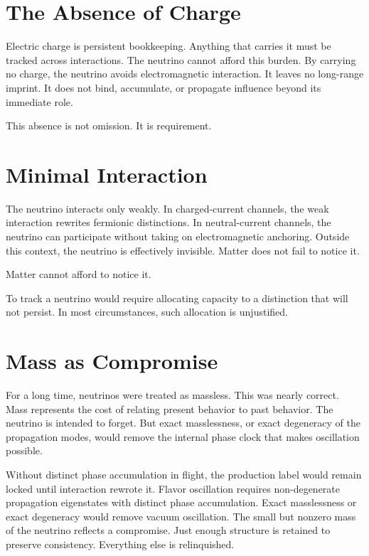 \documentclass[11pt,twoside,openright]{book}
\begin{document}
\section*{The Absence of Charge}

Electric charge is persistent bookkeeping. Anything that carries it must be tracked across interactions. The neutrino cannot afford this burden. By carrying no charge, the neutrino avoids electromagnetic interaction. It leaves no long-range imprint. It does not bind, accumulate, or propagate influence beyond its immediate role.

This absence is not omission. It is requirement.

\section*{Minimal Interaction}

The neutrino interacts only weakly. In charged-current channels, the weak interaction rewrites fermionic distinctions. In neutral-current channels, the neutrino can participate without taking on electromagnetic anchoring. Outside this context, the neutrino is effectively invisible. Matter does not fail to notice it.

Matter cannot afford to notice it.

To track a neutrino would require allocating capacity to a distinction that will not persist. In most circumstances, such allocation is unjustified.

\section*{Mass as Compromise}

For a long time, neutrinos were treated as massless. This was nearly correct. Mass represents the cost of relating present behavior to past behavior. The neutrino is intended to forget. But exact masslessness, or exact degeneracy of the propagation modes, would remove the internal phase clock that makes oscillation possible.

Without distinct phase accumulation in flight, the production label would remain locked until interaction rewrote it. Flavor oscillation requires non-degenerate propagation eigenstates with distinct phase accumulation. Exact masslessness or exact degeneracy would remove vacuum oscillation. The small but nonzero mass of the neutrino reflects a compromise. Just enough structure is retained to preserve consistency. Everything else is relinquished.
\end{document}
